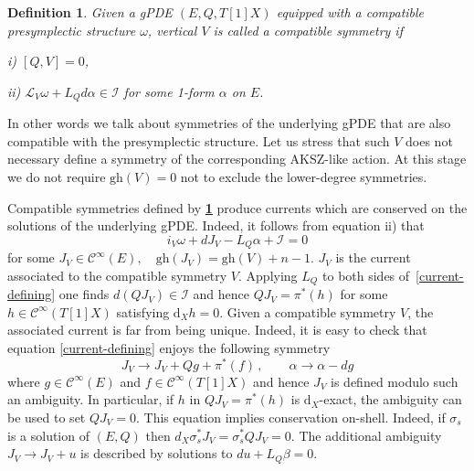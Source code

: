 \documentclass[a4paper,12pt]{article}
\numberwithin{equation}{section} %
\newtheorem{definition}[thm]{Definition}
\newcommand{\bref}[1]{\textbf{\ref{#1}}}
\newcommand{\gh}[1]{\mathrm{gh}(#1)}
\newcommand{\dx}{\mathrm{d}_X}
\newcommand{\cC}{\mathcal{C}}
\def\cI{\mathcal{I}}
\def\cK{\mathcal{K}}
\def\cL{\mathcal{L}}
\begin{document}
\begin{definition} \label{def:comp-sym}\cite{Grigoriev:2023kkk}
    Given a gPDE $(E,Q,T[1]X)$ equipped with a compatible presymplectic structure $\omega$, vertical $V$ is called a compatible symmetry if

    i) $[Q,V] =0$, 
    
    ii) $\cL_{V}\omega + L_Q d \alpha  \in \cI$
    for some 1-form $\alpha$ on $E$.

\end{definition}
In other words we talk about symmetries of the underlying gPDE that are also compatible with the presymplectic structure. Let us stress that such $V$ does not necessary define a symmetry of the corresponding  AKSZ-like action. At this stage we do not require $\gh{V}=0$ not to exclude the lower-degree symmetries.

Compatible symmetries defined by \bref{def:comp-sym} produce currents which are conserved on the solutions of the underlying gPDE. Indeed, it follows from equation ii) that 
\begin{equation} \label{current-defining}
    i_V\omega + dJ_V - L_Q \alpha + \cI = 0
\end{equation}
for some $J_V\in \cC^{\infty}(E), \quad \gh{J_V} = \gh{V}+n-1$.  $J_V$ is the current associated to the compatible symmetry $V$. Applying $L_Q$ to both sides of~\eqref{current-defining} one finds $d(QJ_V) \in \cI$ and hence $QJ_V=\pi^*(h)$ for some $h \in \cC^\infty(T[1]X)$ satisfying $\dx h=0$.  Given a compatible symmetry $V$, the associated current is far from being unique. Indeed, it is easy to check that equation \eqref{current-defining} enjoys the following symmetry 
\begin{equation}
    J_V\to  J_V + Qg + \pi^*(f)\,, \qquad \alpha \to \alpha - dg
\end{equation}
where $g \in \cC^\infty(E)$ and $f\in  \cC^\infty(T[1]X)$ and hence $J_V$ is defined modulo such an ambiguity. In particular, if $h$ in $QJ_V=\pi^*(h)$ is $\dx$-exact, the ambiguity can be  used to set $QJ_V=0$. This equation implies conservation on-shell. Indeed, if $\sigma_s$ is a solution of $(E,Q)$ then $d_X\sigma_s^*J_V = \sigma_s^*Q J_V = 0$. The additional ambiguity $J_V\to J_V+u$ is described by solutions to $du+L_Q\beta=0$.
\end{document}

